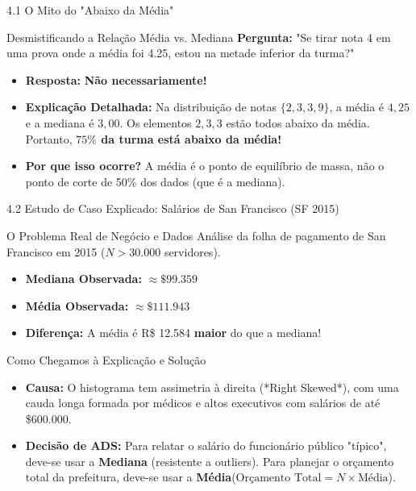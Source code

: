 \documentclass[10pt, aspectratio=169]{beamer}
\begin{document}
\begin{frame}{4.1 O Mito do "Abaixo da Média"}
    \begin{alertblock}{Desmistificando a Relação Média vs. Mediana}
        \textbf{Pergunta:} "Se tirar nota 4 em uma prova onde a média foi 4.25, estou na metade inferior da turma?"
        \begin{itemize}
            \item \textbf{Resposta:} \textbf{Não necessariamente!}
            \item \textbf{Explicação Detalhada:} Na distribuição de notas $\{2, 3, 3, 9\}$, a média é $4{,}25$ e a mediana é $3{,}00$. Os elementos $2, 3, 3$ estão todos abaixo da média. Portanto, \textbf{$75\%$ da turma está abaixo da média!}
            \item \textbf{Por que isso ocorre?} A média é o ponto de equilíbrio de massa, não o ponto de corte de 50\% dos dados (que é a mediana).
        \end{itemize}
    \end{alertblock}
\end{frame}

\begin{frame}{4.2 Estudo de Caso Explicado: Salários de San Francisco (SF 2015)}
    \begin{block}{O Problema Real de Negócio e Dados}
        Análise da folha de pagamento de San Francisco em 2015 ($N > 30.000$ servidores).
        \begin{itemize}
            \item \textbf{Mediana Observada:} $\approx \$99.359$
            \item \textbf{Média Observada:} $\approx \$111.943$
            \item \textbf{Diferença:} A média é R\$ 12.584 \textbf{maior} do que a mediana!
        \end{itemize}
    \end{block}

    \vspace{0.2cm}

    \begin{exampleblock}{Como Chegamos à Explicação e Solução}
        \begin{itemize}
            \item \textbf{Causa:} O histograma tem assimetria à direita (*Right Skewed*), com uma cauda longa formada por médicos e altos executivos com salários de até \$600.000.
            \item \textbf{Decisão de ADS:} Para relatar o salário do funcionário público "típico", deve-se usar a \textbf{Mediana} (resistente a outliers). Para planejar o orçamento total da prefeitura, deve-se usar a \textbf{Média}($\text{Orçamento Total} = N \times \text{Média}$).
        \end{itemize}
    \end{exampleblock}
\end{frame}
\end{document}
